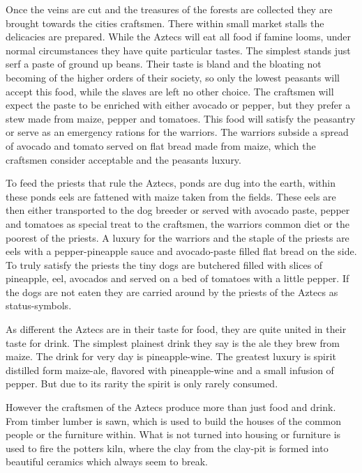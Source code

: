\documentclass[a4paper]{book}
\begin{document}
Once the veins are cut and the treasures of the forests are collected they are
brought towards the cities craftsmen. There within small market stalls the
delicacies are prepared. While the \gls{Aztecs} will eat all food if famine
looms, under normal circumstances they have quite particular tastes. The
simplest stands just serf a paste of ground up beans. Their taste is bland and
the bloating not becoming of the higher orders of their society, so only the
lowest peasants will accept this food, while the slaves are left no other
choice. The craftsmen will expect the paste to be enriched with either avocado
or pepper, but they prefer a stew made from maize, pepper and tomatoes. This
food will satisfy the peasantry or serve as an emergency rations for the
warriors. The warriors subside a spread of avocado and tomato served on flat
bread made from maize, which the craftsmen consider acceptable and the peasants
luxury.

To feed the priests that rule the \gls{Aztecs}, ponds are dug into the earth,
within these ponds eels are fattened with maize taken from the fields. These
eels are then either transported to the dog breeder or served with avocado
paste, pepper and tomatoes as special treat to the craftsmen, the warriors
common diet or the poorest of the priests. A luxury for the warriors and the
staple of the priests are eels with a pepper-pineapple sauce and avocado-paste
filled flat bread on the side. To truly satisfy the priests the tiny dogs are
butchered filled with slices of pineapple, eel, avocados and served on a bed of
tomatoes with a little pepper. If the dogs are not eaten they are carried
around by the priests of the \gls{Aztecs} as status-symbols.

As different the \gls{Aztecs} are in their taste for food, they are quite
united in their taste for drink. The simplest plainest drink they say is the
ale they brew from maize. The drink for very day is pineapple-wine. The
greatest luxury is spirit distilled form maize-ale, flavored with
pineapple-wine and a small infusion of pepper. But due to its rarity the spirit
is only rarely consumed.

However the craftsmen of the \gls{Aztecs} produce more than just food and
drink. From timber lumber is sawn, which is used to build the houses of the
common people or the furniture within. What is not turned into housing or
furniture is used to fire the potters kiln, where the clay from the clay-pit is
formed into beautiful ceramics which always seem to break.
\end{document}
